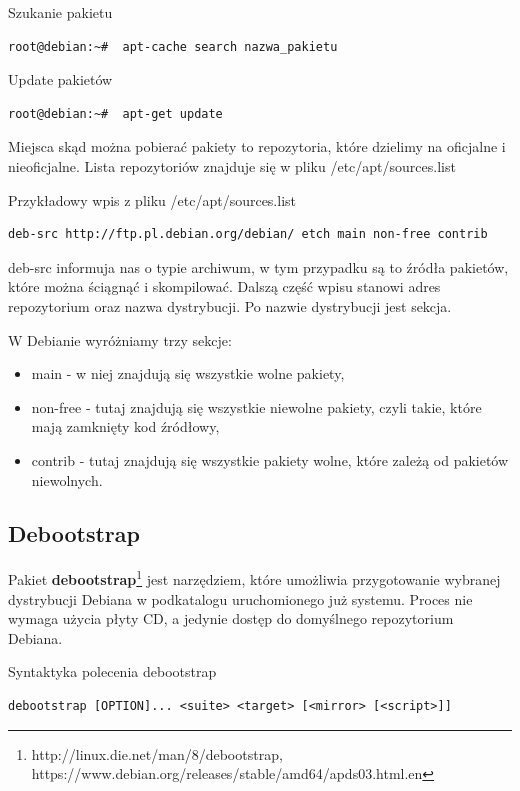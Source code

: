 \newline
Szukanie pakietu
\begin{lstlisting}
root@debian:~#  apt-cache search nazwa_pakietu
\end{lstlisting}

\newline
Update pakietów
\begin{lstlisting}
root@debian:~#  apt-get update
\end{lstlisting}


Miejsca skąd można pobierać pakiety to repozytoria, które dzielimy na oficjalne i nieoficjalne. Lista repozytoriów znajduje się w pliku /etc/apt/sources.list

\newline

Przykładowy wpis z pliku /etc/apt/sources.list
\begin{lstlisting}
deb-src http://ftp.pl.debian.org/debian/ etch main non-free contrib
\end{lstlisting}

deb-src informuja nas o typie archiwum, w tym przypadku są to źródła pakietów, które można ściągnąć i skompilować. Dalszą część wpisu stanowi adres repozytorium oraz nazwa dystrybucji. Po nazwie dystrybucji jest sekcja.


W Debianie wyróżniamy trzy sekcje:
\begin{itemize}
	\item main - w niej znajdują się wszystkie wolne pakiety,
	\item non-free - tutaj znajdują się wszystkie niewolne pakiety, czyli takie, które mają zamknięty kod źródłowy,
	\item contrib - tutaj znajdują się wszystkie pakiety wolne, które zależą od pakietów niewolnych.
\end{itemize}


\subsection{Debootstrap}

Pakiet \textbf{debootstrap}\footnote{http://linux.die.net/man/8/debootstrap, https://www.debian.org/releases/stable/amd64/apds03.html.en} jest narzędziem, które umożliwia przygotowanie wybranej dystrybucji Debiana w podkatalogu uruchomionego już systemu. Proces nie wymaga użycia płyty CD, a jedynie dostęp do domyślnego repozytorium Debiana. 


\newline
Syntaktyka polecenia debootstrap
\begin{lstlisting}
debootstrap [OPTION]... <suite> <target> [<mirror> [<script>]]
\end{lstlisting}

